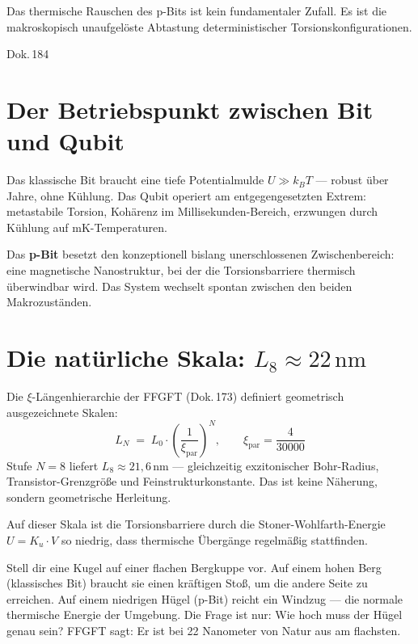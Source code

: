 \label{ch:pbit}

\epigraph{Das thermische Rauschen des p-Bits ist kein fundamentaler Zufall.
Es ist die makroskopisch unaufgelöste Abtastung deterministischer
Torsionskonfigurationen.}{Dok.\,184}

\section{Der Betriebspunkt zwischen Bit und Qubit}

Das klassische Bit braucht eine tiefe Potentialmulde $U \gg k_B T$ ---
robust über Jahre, ohne Kühlung. Das Qubit operiert am entgegengesetzten
Extrem: metastabile Torsion, Kohärenz im Millisekunden-Bereich, erzwungen
durch Kühlung auf mK-Temperaturen.

Das \textbf{p-Bit} besetzt den konzeptionell bislang unerschlossenen
Zwischenbereich: eine magnetische Nanostruktur, bei der die
Torsionsbarriere thermisch überwindbar wird. Das System wechselt spontan
zwischen den beiden Makrozuständen.

\section{Die natürliche Skala: \texorpdfstring{$L_8 \approx 22\,\text{nm}$}{L8 ca. 22nm}}

Die $\xi$-Längenhierarchie der FFGFT (Dok.\,173) definiert geometrisch
ausgezeichnete Skalen:
\[
  L_N \;=\; L_0 \cdot \left(\frac{1}{\xi_{\text{par}}}\right)^{\!N},
  \qquad \xi_{\text{par}} = \frac{4}{30000}
\]
Stufe $N = 8$ liefert $L_8 \approx 21{,}6\,\text{nm}$ --- gleichzeitig
exzitonischer Bohr-Radius, Transistor-Grenzgröße und Feinstruktur\-konstante.
Das ist keine Näherung, sondern geometrische Herleitung. 

Auf dieser Skala ist die Torsionsbarriere durch die
Stoner-Wohlfarth-Energie $U = K_u \cdot V$ so niedrig, dass thermische
Übergänge regelmäßig stattfinden.

\begin{laierspur}
Stell dir eine Kugel auf einer flachen Bergkuppe vor. Auf einem hohen Berg
(klassisches Bit) braucht sie einen kräftigen Stoß, um die andere Seite
zu erreichen. Auf einem niedrigen Hügel (p-Bit) reicht ein Windzug ---
die normale thermische Energie der Umgebung. Die Frage ist nur:
Wie hoch muss der Hügel genau sein? FFGFT sagt: Er ist bei 22 Nanometer
von Natur aus am flachsten.
\end{laierspur}

